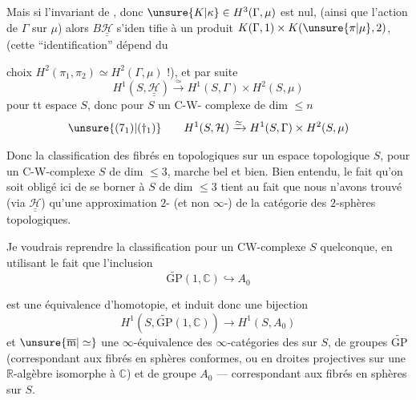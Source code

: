 Mais si l'invariant de , donc
$\unsure{K|\kappa}\in H^3(\Gamma,\mu)$ est nul,
 (ainsi que l'action
de $\Gamma$ sur $\mu$) alors 
$B\underline{\underline{\mathcal H}}$ s'iden%
tifie à un produit $K(\Gamma,1)\times K(\unsure{\pi|\mu},2)$,
(cette ``identification'' dépend  du

choix  $H^2(\pi_1,\pi_2)\simeq H^2(\Gamma,\mu)$ !), et par
suite
\[
H^1(S,\underline{\underline{\mathcal H}})\xrightarrow{\simeq}
H^1(S,\Gamma)\times H^2(S,\mu)
\]
pour tt espace $S$, donc pour $S$ un C-W-%
complexe de dim $\leq n$
\[
\unsure{(7_1)|(\dagger_1)}\qquad
H^1(S,\mathcal H)\xrightarrow{\simeq}H^1(S,\Gamma)\times H^2(S,\mu)
\]

Donc la classification des fibrés en 
topologiques sur un espace topologique $S$,
pour un C-W-complexe $S$ de dim $\leq3$,
marche bel et bien. Bien entendu, le
fait qu'on soit obligé ici de se borner à
 $S$ de dim $\leq3$ tient au fait
que nous n'avons trouvé 
(via $\underline{\underline{\mathcal H}}$)
qu'une approximation $2$- (et non
$\infty$-) de la catégorie des $2$-sphères
topologiques.

Je voudrais reprendre la classification
pour un CW-complexe $S$ quelconque, en
utilisant le fait que l'inclusion
\[
\widetilde{\mathrm{GP}}(1,\mathbb C)\hookrightarrow A_0
\]

est une équivalence d'homotopie, et induit
donc une bijection
\[
H^1(S,\widetilde{\mathrm{GP}}(1,\mathbb C))\longrightarrow H^1(S,A_0)
\]
et $\unsure{\overline{\mathrm m}|\simeq}$ une $\infty$-équivalence des $\infty$-catégories des
  sur $S$, de groupes
$\widetilde{\mathrm{GP}}$ (correspondant
aux fibrés en sphères conformes, ou en
droites projectives sur une  $\mathbb R$-algèbre
isomorphe à $\mathbb C$) et de groupe $A_0$ --- correspondant
aux fibrés en sphères sur $S$.

